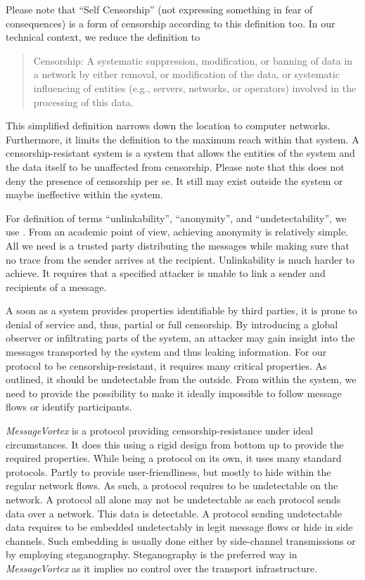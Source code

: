 \documentclass[acmsmall, screen]{acmart}
\begin{document}
Please note that ``Self Censorship'' (not expressing something in fear of consequences)  is a form of censorship according to this definition too. In our technical context, we reduce the definition to
\begin{quote}
	Censorship: A systematic suppression, modification, or banning of data in a network by either removal, or modification of the data, or systematic influencing of entities (e.g., servers, networks, or operators) involved in the processing of this data.
\end{quote}

This simplified definition narrows down the location to computer networks.  Furthermore, it limits the definition to the maximum reach within that system. A censorship-resistant system is a system that allows the entities of the system and the data itself to be unaffected from censorship. Please note that this does not deny the presence of censorship per se. It still may exist outside the system or maybe ineffective within the system. 

For definition of terms ``unlinkability'', ``anonymity'', and ``undetectability'', we use \cite{anon_terminology}. From an academic point of view, achieving anonymity is relatively simple. All we need is a trusted party distributing the messages while making sure that no trace from the sender arrives at the recipient. Unlinkability is much harder to achieve. It requires that a specified attacker is unable to link a sender and recipients of a message. 

A soon as a system provides properties identifiable by third parties, it is prone to denial of service and, thus, partial or full censorship. By introducing a global observer or infiltrating parts of the system, an attacker may gain insight into the messages transported by the system and thus leaking information. For our protocol to be censorship-resistant, it requires many critical properties. As outlined, it should be undetectable from the outside. From within the system, we need to provide the possibility to make it ideally impossible to follow message flows or identify participants.

\emph{MessageVortex} is a protocol providing censorship-resistance under ideal circumstances. It does this using a rigid design from bottom up to provide the required properties. While being a protocol on its own, it uses many standard protocols. Partly to provide user-friendliness, but mostly to hide within the regular network flows. As such, a protocol requires to be undetectable on the network. A protocol all alone may not be undetectable as each protocol sends data over a network. This data is detectable. A protocol sending undetectable data requires to be embedded undetectably in legit message flows or hide in side channels. Such embedding is usually done either by side-channel transmissions or by employing steganography. Steganography is the preferred way in \emph{MessageVortex} as it implies no control over the transport infrastructure.
\end{document}

